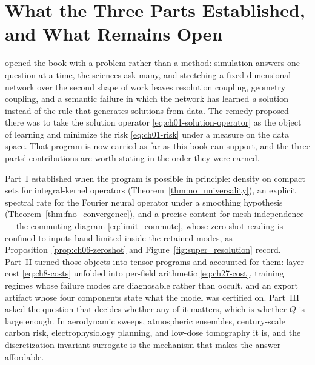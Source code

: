\section{What the Three Parts Established, and What Remains Open}
\label{sec:ch38-closing}

 opened the book with a problem
rather than a method: simulation answers one question at a time, the sciences ask many, and
stretching a fixed-dimensional network over the second shape of work leaves resolution
coupling, geometry coupling, and a semantic failure in which the network has learned \emph{a}
solution instead of the rule that generates solutions from data. The remedy proposed there was
to take the solution operator \eqref{eq:ch01-solution-operator} as the object of learning and
minimize the risk \eqref{eq:ch01-risk} under a measure on the data space. That program is now
carried as far as this book can support, and the three parts' contributions are worth stating
in the order they were earned.

Part~I established when the program is possible in principle: density on compact sets for
integral-kernel operators (Theorem~\ref{thm:no_universality}), an explicit spectral rate for
the Fourier neural operator under a smoothing hypothesis (Theorem~\ref{thm:fno_convergence}),
and a precise content for mesh-independence --- the commuting diagram \eqref{eq:limit_commute},
whose zero-shot reading is confined to inputs band-limited inside the retained modes, as
Proposition~\ref{prop:ch06-zeroshot} and Figure~\ref{fig:super_resolution} record. Part~II
turned those objects into tensor programs and accounted for them: layer cost
\eqref{eq:ch8-costs} unfolded into per-field arithmetic \eqref{eq:ch27-cost}, training regimes
whose failure modes are diagnosable rather than occult, and an export artifact whose four
components state what the model was certified on. Part~III asked the question that decides
whether any of it matters, which is whether $Q$ is large enough. In aerodynamic sweeps,
atmospheric ensembles, century-scale carbon risk, electrophysiology planning, and low-dose
tomography it is, and the discretization-invariant surrogate is the mechanism that makes the
answer affordable.

